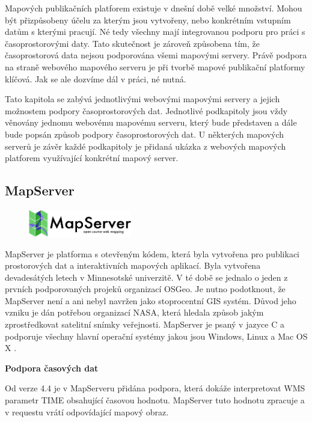 Mapových publikačních platforem existuje v dnešní době velké
množství. Mohou být přizpůsobeny účelu za kterým jsou vytvořeny, nebo
konkrétním vstupním datům s kterými pracují. Né tedy všechny mají
integrovanou podporu pro práci s časoprostorovými daty. Tato
skutečnost je zároveň způsobena tím, že časoprostorová data nejsou
podporována všemi mapovými servery. Právě podpora na straně webového
mapového serveru je při tvorbě mapové publikační platformy
klíčová. Jak se ale dozvíme dál v práci, né nutná.
 
Tato kapitola se zabývá jednotlivými webovými mapovými servery a
jejich možnostem podpory časoprostorových dat. Jednotlivé podkapitoly
jsou vždy věnovány jednomu webovému mapovému serveru, který bude
představen a dále bude popsán způsob podpory časoprostorových dat. U
některých mapových serverů je závěr každé podkapitoly je přidaná
ukázka z webových mapových platforem využívající konkrétní mapový
server.

\subsection{MapServer}

\begin{figure}[h!]
	\centering
	\includegraphics[width=0.4\textwidth]{../img/mapserver-logo.png}
	\label{fig:mapserver-logo}
\end{figure}
\bigskip

MapServer je platforma s otevřeným kódem, která byla vytvořena pro
publikaci prostorových dat a interaktivních mapových aplikací. Byla
vytvořena devadesátých letech v Minnesotské univerzitě. V té době se
jednalo o jeden z prvních podporovaných projeků organizací OSGeo. Je
nutno podotknout, že MapServer není a ani nebyl navržen jako
stoprocentní GIS systém. Důvod jeho vzniku je dán potřebou organizací
NASA, která hledala způsob jakým zprostředkovat satelitní snímky
veřejnosti. MapServer je psaný v jazyce C a podporuje všechny hlavní
operační systémy jakou jsou Windows, Linux a Mac OS X
\cite{mapserver_about}.

\bigskip
\noindent
\textbf{Podpora časových dat}

Od verze 4.4 je v MapServeru přidána podpora, která dokáže
interpretovat WMS parametr TIME obsahující časovou hodnotu. MapServer
tuto hodnotu zpracuje a v requestu vrátí odpovídající mapový obraz.

